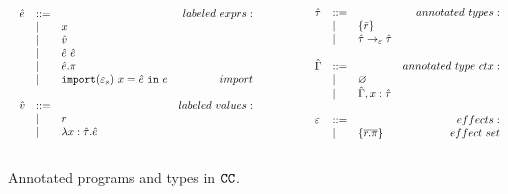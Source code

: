 \begin{figure}
\[
\begin{array}{lll}

\begin{array}{lllr}

\hat e & ::= & ~ & labeled~exprs: \\
	& | & x \\
	& | & \hat v \\
	& | & \hat e ~ \hat e \\
	& | & \hat e.\pi \\
	& | & \mathtt{import}(\varepsilon_s)~x = \hat e~\mathtt{in}~e & import \\
	&&\\

\hat v & ::= & ~ & labeled~values: \\
	& | & r \\
	& | & \lambda x: \hat \tau.\hat e \\
	&&\\

\end{array}

& ~~~~~~~~&

\begin{array}{lllr}

\hat \tau & ::= & ~ & annotated ~types: \\
		& | & \{ \bar r \} \\
		& | & \hat \tau \rightarrow_{\varepsilon} \hat \tau \\
		&&\\

\hat \Gamma & ::= & ~ & annotated~type~ctx:\\
				& | & \varnothing \\
				& | & \hat \Gamma, x: \hat \tau \\
				&&\\

\varepsilon & ::= & ~ & effects: \\
		& | & \{ \overline{r.\pi} \} & effect~set \\
		&&\\

\end{array}

\end{array}
\]
\vspace{-0.5cm}
\caption{Annotated programs and types in $\mathtt{CC}$.}
\vspace{-0.5cm}
\label{fig:epscalc_annotated_grammar}
\end{figure}

